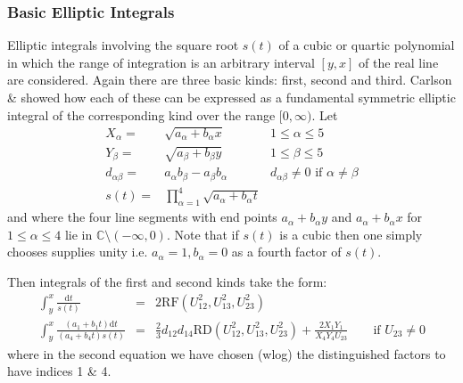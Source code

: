 \subsubsection{Basic Elliptic Integrals}
Elliptic integrals involving the square root $s(t)$ of a cubic or quartic
polynomial in which the range of integration is an arbitrary interval $[y,x]$
of the real line are considered. Again there are three basic kinds: first,
second and third. Carlson \cite{Carlson:88} \& \cite{Carlson:99} showed how each
of these can be expressed as a fundamental symmetric elliptic integral of the
corresponding kind over the range $[0,\infty)$. Let
\begin{eqnarray*}
X_\alpha  = & \sqrt{a_\alpha+b_\alpha x} \quad & 1 \leq \alpha \leq 5\\
Y_\beta  = & \sqrt{a_\beta+b_\beta y} \quad & 1 \leq \beta \leq 5\\
d_{\alpha\beta}  = & a_\alpha b_\beta - a_\beta b_\alpha \quad & d_{\alpha\beta} \neq 0\mbox{ if } \alpha \neq \beta\\
s(t)  = &  \prod^4_{\alpha=1} \sqrt{a_\alpha+b_\alpha t}
\end{eqnarray*}
and where the four line segments with end points $a_\alpha+b_\alpha y$ and
$a_\alpha+b_\alpha x$ for $1\leq\alpha\leq 4$ lie in $ \mathbb{C} \setminus (-\infty, 0)$.
Note that if $s(t)$ is a cubic then one simply chooses supplies unity
i.e. $a_\alpha=1, b_\alpha=0$ as a fourth factor of $s(t)$.

Then integrals of the first and second kinds take the form:
\begin{eqnarray*}
\int_y^x \frac{\mathrm{d}t}{s(t)} &=& 2\mathrm{RF}(U_{12}^2, U_{13}^2, U_{23}^2)\\
\int_y^x\frac{(a_1+b_1t)\mathrm{d}t}{(a_4+b_4t)s(t)} &=& \frac{2}{3}d_{12}d_{14}
\mathrm{RD}(U_{12}^2, U_{13}^2, U_{23}^2) +\frac{2X_1Y_1}{X_4Y_4U_{23}}\qquad
\mbox{if }U_{23}\neq 0
\end{eqnarray*}
where in the second equation we have chosen (wlog) the distinguished factors to have
indices 1 \& 4.

